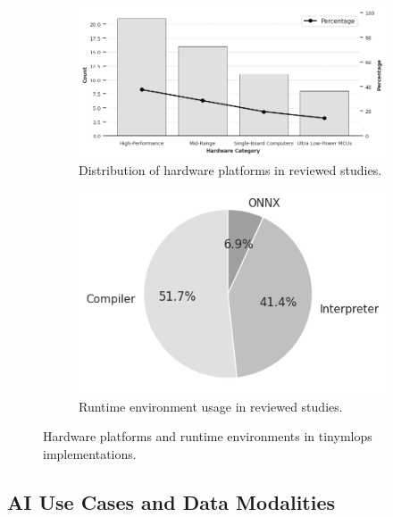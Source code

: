 \begin{figure}[htbp]
    \centering
    \begin{subfigure}{0.64\textwidth}
        \centering
        \includegraphics[width=\textwidth]{figs/research_results/hardware-platforms.png}
        \caption[Hardware platform distribution]{Distribution of hardware platforms in reviewed studies.}
        \label{fig:hardware-platforms}
    \end{subfigure}
    \hfill
    \begin{subfigure}{0.34\textwidth}
        \centering
        \includegraphics[width=\textwidth]{figs/research_results/runtime.png}
        \caption[Runtime environment distribution]{Runtime environment usage in reviewed studies.}
        \label{fig:runtime-env}
    \end{subfigure}
    \caption{Hardware platforms and runtime environments in \gls{tinymlops} implementations.}
    \label{fig:hardware-vs-runtime}
\end{figure}

\subsection{AI Use Cases and Data Modalities}
\label{ssec:AIUseCaseResults}


